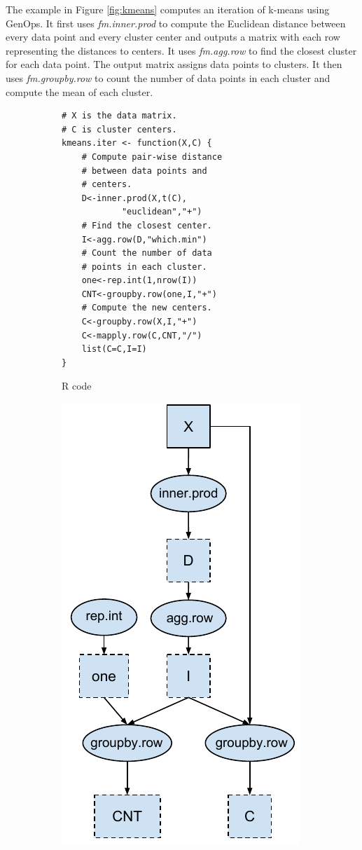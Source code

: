 The example in Figure \ref{fig:kmeans} computes an iteration of k-means
\cite{kmeans} using GenOps. It first uses \textit{fm.inner.prod} to
compute the Euclidean distance between every data point and every cluster center
and outputs a matrix with each row representing the distances to centers.  
It uses \textit{fm.agg.row} to find the closest
cluster for each data point.  The output matrix 
assigns data points to clusters. It then uses \textit{fm.groupby.row} to count
the number of data points in each cluster and compute the mean of each cluster.

\begin{figure}
\centering
	\footnotesize
	\begin{subfigure}{.25\textwidth}
	\centering
	\begin{verbatim}
# X is the data matrix.
# C is cluster centers.
kmeans.iter <- function(X,C) {
	# Compute pair-wise distance
	# between data points and
	# centers.
	D<-inner.prod(X,t(C),
			"euclidean","+")
	# Find the closest center.
	I<-agg.row(D,"which.min")
	# Count the number of data
	# points in each cluster.
	one<-rep.int(1,nrow(I))
	CNT<-groupby.row(one,I,"+")
	# Compute the new centers.
	C<-groupby.row(X,I,"+")
	C<-mapply.row(C,CNT,"/")
	list(C=C,I=I)
}
	\end{verbatim}
  \vspace{-4pt}
	\label{fig:code}
		\caption{R code }
	\hspace{20pt}
	\end{subfigure}%
	\begin{subfigure}{.25\textwidth}
	\centering
	\includegraphics[scale=0.5]{FlashMatrix_figs/DAG.pdf}

\end{subfigure}
\end{figure}
